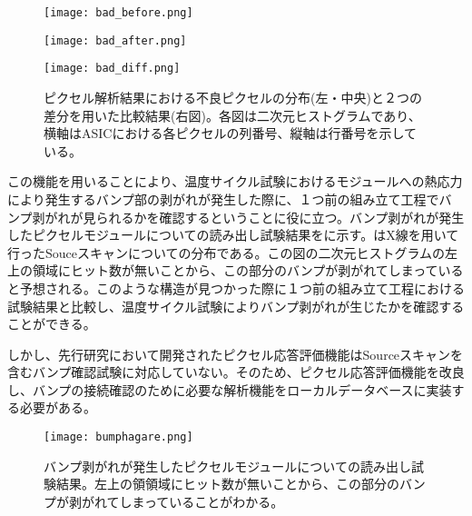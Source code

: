 \begin{figure}[tbp]
 \begin{minipage}{0.33\hsize}
  \begin{center}
   \texttt{[image: bad\_before.png]}
  \end{center}
 \end{minipage}
 \begin{minipage}{0.33\hsize}
 \begin{center}
  \texttt{[image: bad\_after.png]}
 \end{center}
 \end{minipage}
 \begin{minipage}{0.33\hsize}
 \begin{center}
  \texttt{[image: bad\_diff.png]}
 \end{center}
 \end{minipage}
 \caption[ピクセル解析結果における不良ピクセルの分布と２つの差分を用いた比較結果]{ピクセル解析結果における不良ピクセルの分布(左・中央)と２つの差分を用いた比較結果(右図)。各図は二次元ヒストグラムであり、横軸はASICにおける各ピクセルの列番号、縦軸は行番号を示している。}
 \label{fig:badpixel}
\end{figure}

この機能を用いることにより、温度サイクル試験におけるモジュールへの熱応力により発生するバンプ部の剥がれが発生した際に、１つ前の組み立て工程でバンプ剥がれが見られるかを確認するということに役に立つ。バンプ剥がれが発生したピクセルモジュールについての読み出し試験結果をに示す。はX線を用いて行ったSouceスキャンについての分布である。この図の二次元ヒストグラムの左上の領域にヒット数が無いことから、この部分のバンプが剥がれてしまっていると予想される。このような構造が見つかった際に１つ前の組み立て工程における試験結果と比較し、温度サイクル試験によりバンプ剥がれが生じたかを確認することができる。

しかし、先行研究において開発されたピクセル応答評価機能はSourceスキャンを含むバンプ確認試験に対応していない。そのため、ピクセル応答評価機能を改良し、バンプの接続確認のために必要な解析機能をローカルデータベースに実装する必要がある。


\begin{figure}[tbp]
  \centering
  \texttt{[image: bumphagare.png]}
  \caption[バンプ剥がれが発生したピクセルモジュールについての読み出し試験結果]{バンプ剥がれが発生したピクセルモジュールについての読み出し試験結果。左上の領領域にヒット数が無いことから、この部分のバンプが剥がれてしまっていることがわかる。}
  \label{fig:bumphagare}
\end{figure}



